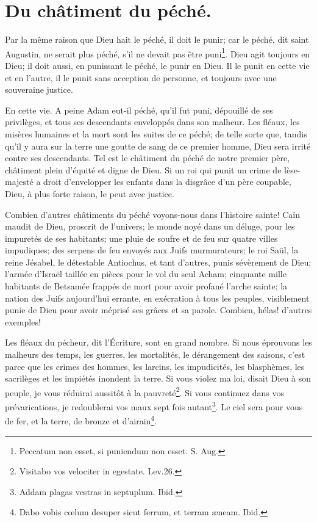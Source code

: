 \documentclass[instructions.tex]{subfiles}
\begin{document}
\chapter{Du châtiment du péché.}


Par la même raison que Dieu hait le péché, il doit le punir; car le péché, dit saint Augustin, ne serait plus péché, s'il ne devait pas être puni\footnote{Peccatum non esset, si puniendum non esset. S. Aug.}. Dieu agit toujours en Dieu; il doit aussi, en punissant le péché, le punir en Dieu. Il le punit en cette vie et en l'autre, il le punit sans acception de personne, et toujours avec une souveraine justice.

\primo En cette vie. A peine Adam eut-il péché, qu'il fut puni, dépouillé de ses privilèges, et tous ses descendants enveloppés dans son malheur. Les fléaux, les misères humaines et la mort sont les suites de ce péché; de telle sorte que, tandis qu'il y aura sur la terre une goutte de sang de ce premier homme, Dieu sera irrité contre ses descendants. Tel est le châtiment du péché de notre premier père, châtiment plein d'équité et digne de Dieu. Si un roi qui punit un crime de lèse-majesté a droit d'envelopper les enfants dans la disgrâce d'un père coupable, Dieu, à plus forte raison, le peut avec justice.

Combien d'autres châtiments du péché voyons-nous dans l'histoire sainte! Caïn maudit de Dieu, proscrit de l'univers; le monde noyé dans un déluge, pour les impuretés de ses habitants; une pluie de soufre et de feu sur quatre villes impudiques; des serpens de feu envoyés aux Juifs murmurateurs; le roi Saül, la reine Jésabel, le détestable Antiochus, et tant d'autres, punis sévèrement de Dieu; l'armée d'Israël taillée en pièces pour le vol du seul Acham; cinquante mille habitants de Betsamée frappés de mort pour avoir profané l'arche sainte; la nation des Juifs aujourd'hui errante, en exécration à tous les peuples, visiblement punie de Dieu pour avoir méprisé ses grâces et sa parole. Combien, hélas! d'autres exemples!

Les fléaux du pécheur, dit l'Écriture, sont en grand nombre. Si nous éprouvons les malheurs des temps, les guerres, les mortalités, le dérangement des saisons, c'est parce que les crimes des hommes, les larcins, les impudicités, les blasphèmes, les sacrilèges et les impiétés inondent la terre. Si vous violez ma loi, disait Dieu à son peuple, je vous réduirai aussitôt à la pauvreté\footnote{Visitabo vos velociter in egestate. Lev.26.}. Si vous continuez dans vos prévarications, je redoublerai vos maux sept fois autant\footnote{Addam plagas vestras in septuplum. Ibid.}. Le ciel sera pour vous de fer, et la terre, de bronze et d'airain\footnote{Dabo vobis cœlum desuper sicut ferrum, et terram æneam. Ibid.}.
\end{document}
